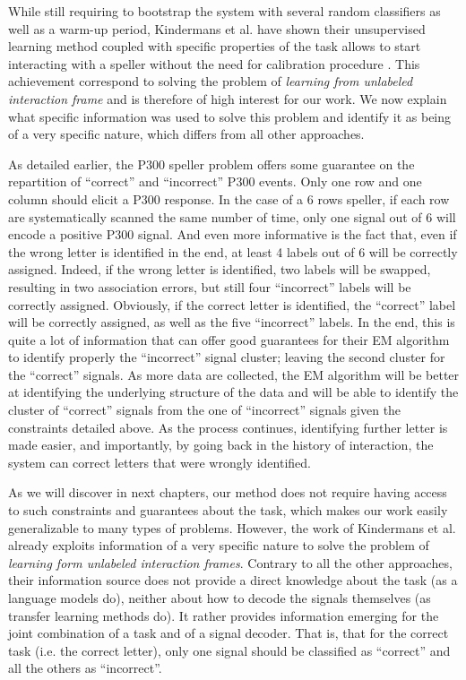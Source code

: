 While still requiring to bootstrap the system with several random classifiers as well as a warm-up period, Kindermans et al. have shown their unsupervised learning method coupled with specific properties of the task allows to start interacting with a speller without the need for calibration procedure \cite{Kindermans2012a,kindermans2014true}. This achievement correspond to solving the problem of \emph{learning from unlabeled interaction frame} and is therefore of high interest for our work. We now explain what specific information was used to solve this problem and identify it as being of a very specific nature, which differs from all other approaches.

As detailed earlier, the P300 speller problem offers some guarantee on the repartition of ``correct'' and ``incorrect'' P300 events. Only one row and one column should elicit a P300 response. In the case of a 6 rows speller, if each row are systematically scanned the same number of time, only one signal out of 6 will encode a positive P300 signal. And even more informative is the fact that, even if the wrong letter is identified in the end, at least 4 labels out of 6 will be correctly assigned. Indeed, if the wrong letter is identified, two labels will be swapped, resulting in two association errors, but still four ``incorrect'' labels will be correctly assigned. Obviously, if the correct letter is identified, the ``correct'' label will be correctly assigned, as well as the five ``incorrect'' labels. In the end, this is quite a lot of information that can offer good guarantees for their EM algorithm to identify properly the ``incorrect'' signal cluster; leaving the second cluster for the ``correct'' signals. As more data are collected, the EM algorithm will be better at identifying the underlying structure of the data and will be able to identify the cluster of ``correct'' signals from the one of ``incorrect'' signals given the constraints detailed above. As the process continues, identifying further letter is made easier, and importantly, by going back in the history of interaction, the system can correct letters that were wrongly identified.

As we will discover in next chapters, our method does not require having access to such constraints and guarantees about the task, which makes our work easily generalizable to many types of problems. However, the work of Kindermans et al. already exploits information of a very specific nature to solve the problem of \emph{learning form unlabeled interaction frames}. Contrary to all the other approaches, their information source does not provide a direct knowledge about the task (as a language models do), neither about how to decode the signals themselves (as transfer learning methods do). It rather provides information emerging for the joint combination of a task and of a signal decoder. That is, that for the correct task (i.e. the correct letter), only one signal should be classified as ``correct'' and all the others as ``incorrect''. 

